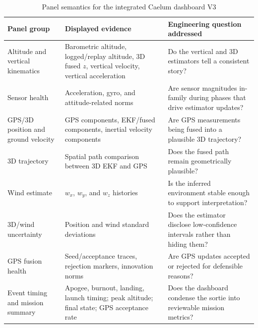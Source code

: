 \documentclass[colorlinks,upint,subscriptcorrection,varvw,hyphenate,balance]{asmeconf}
\begin{document}
\begin{table}[t]
\caption{Panel semantics for the integrated Caelum dashboard V3}
\centering
\begin{tabularx}{\textwidth}{l Y Y}
\toprule
Panel group & Displayed evidence & Engineering question addressed \\
\midrule
Altitude and vertical kinematics & Barometric altitude, logged/replay altitude, 3D fused $z$, vertical velocity, vertical acceleration & Do the vertical and 3D estimators tell a consistent story? \\
Sensor health & Acceleration, gyro, and attitude-related norms & Are sensor magnitudes in-family during phases that drive estimator updates? \\
GPS/3D position and ground velocity & GPS components, EKF/fused components, inertial velocity components & Are GPS measurements being fused into a plausible 3D trajectory? \\
3D trajectory & Spatial path comparison between 3D EKF and GPS & Does the fused path remain geometrically plausible? \\
Wind estimate & $w_x$, $w_y$, and $w_z$ histories & Is the inferred environment stable enough to support interpretation? \\
3D/wind uncertainty & Position and wind standard deviations & Does the estimator disclose low-confidence intervals rather than hiding them? \\
GPS fusion health & Seed/acceptance traces, rejection markers, innovation norms & Are GPS updates accepted or rejected for defensible reasons? \\
Event timing and mission summary & Apogee, burnout, landing, launch timing; peak altitude; final state; GPS acceptance rate & Does the dashboard condense the sortie into reviewable mission metrics? \\
\bottomrule
\end{tabularx}
\label{tab:v3_dashboard_panels}
\end{table}
\end{document}

